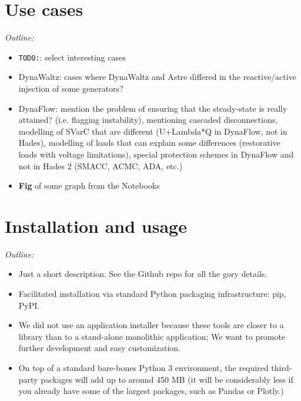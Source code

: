 \documentclass[conference]{IEEEtran}
\newcommand{\TODO}{\texttt{TODO:}}
\begin{document}
\section{Use cases}

\begin{center}
  \itshape  Outline:
  \begin{itemize}
    \item \TODO: select interesting cases
    \item DynaWaltz: cases where DynaWaltz and Astre differed in the
          reactive/active injection of some generators?
    \item DynaFlow: mention the problem of ensuring that the steady-state
          is really attained? (i.e. flagging instability), mentioning cascaded disconnections, modelling of SVarC that are different (U+Lambda*Q in DynaFlow, not in Hades), modelling of loads that can explain some differences (restorative loads with voltage limitations), special protection schemes in DynaFlow and not in Hades 2 (SMACC, ACMC, ADA, etc.)
    \item \textbf{Fig} of some graph from the Notebooks
  \end{itemize}
\end{center}


\section{Installation and usage}
\begin{center}
  \itshape Outline:
  \begin{itemize}
    \item Just a short description. See the Github repo for all the gory
          details.
    \item Facilitated installation via standard Python packaging
          infrastructure: pip, PyPI.
    \item We did not use an application installer because these tools are
          closer to a library than to a stand-alone monolithic application; We
          want to promote further development and easy customization.
    \item On top of a standard bare-bones Python 3 environment, the
          required third-party packages will add up to around 450 MB
          (it will be considerably less if you already have some of the
          largest packages, such as Pandas or Plotly.)
  \end{itemize}
\end{center}
\end{document}
